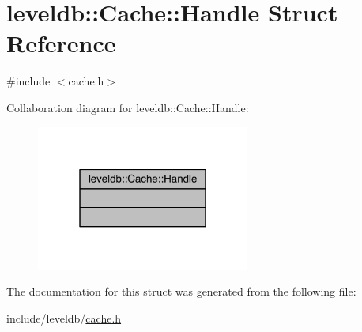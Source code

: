 \hypertarget{structleveldb_1_1_cache_1_1_handle}{}\section{leveldb\+:\+:Cache\+:\+:Handle Struct Reference}
\label{structleveldb_1_1_cache_1_1_handle}


{\ttfamily \#include $<$cache.\+h$>$}



Collaboration diagram for leveldb\+:\+:Cache\+:\+:Handle\+:\nopagebreak
\begin{figure}[H]
\begin{center}
\leavevmode
\includegraphics[width=199pt]{structleveldb_1_1_cache_1_1_handle__coll__graph}
\end{center}
\end{figure}


The documentation for this struct was generated from the following file\+:\begin{DoxyCompactItemize}
\item 
include/leveldb/\hyperlink{cache_8h}{cache.\+h}\end{DoxyCompactItemize}
